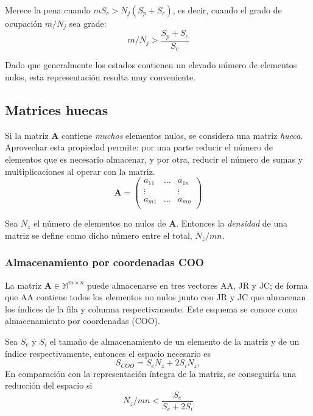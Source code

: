 \documentclass{article}
\newcommand*\mat[1]{ \begin{pmatrix} #1 \end{pmatrix}}
\theoremstyle{definition}
\begin{document}
Merece la pena cuando $mS_c > N_j(S_p + S_c)$, es decir, cuando el grado de 
ocupación $m/N_j$ sea grade:
$$m/N_j > \frac{S_p + S_c}{S_c}$$

Dado que generalmente los estados contienen un elevado número de elementos 
nulos, esta representación resulta muy conveniente.


\subsection{Matrices huecas}

Si la matriz \textbf{A} contiene \textit{muchos} elementos nulos, se considera 
una matriz \textit{hueca}. Aprovechar esta propiedad permite: por una parte 
reducir el número de elementos que es necesario almacenar, y por otra, reducir 
el número de sumas y multiplicaciones al operar con la matriz.
$$ \textbf{A} = \mat{ a_{11} & \ldots & a_{1n} \\
		\vdots &   & \vdots \\
		a_{m1} & \ldots & a_{mn}\\
	}
$$

Sea $N_z$ el número de elementos no nulos de \textbf{A}. Entonces la 
\textit{densidad} de una matriz se define como dicho número entre el total, 
$N_z/mn$.

\subsubsection{Almacenamiento por coordenadas COO}

La matriz $\textbf{A} \in \mathbb{M}^{m\times n}$ puede almacenarse en tres 
vectores AA, JR y JC; de forma que AA contiene todos los elementos no nulos 
junto con JR y JC que almacenan los índices de la fila y columna 
respectivamente. Este esquema se conoce como almacenamiento por coordenadas 
(COO).

Sea $S_e$ y $S_i$ el tamaño de almacenamiento de un elemento de la matriz y de 
un índice respectivamente, entonces el espacio necesario es
$$ S_{COO} = S_eN_z + 2S_iN_z, $$
En comparación con la representación íntegra de la matriz, se conseguiría una 
reducción del espacio si
$$ N_z/mn < \frac{S_e}{S_e + 2S_i} $$
\end{document}
